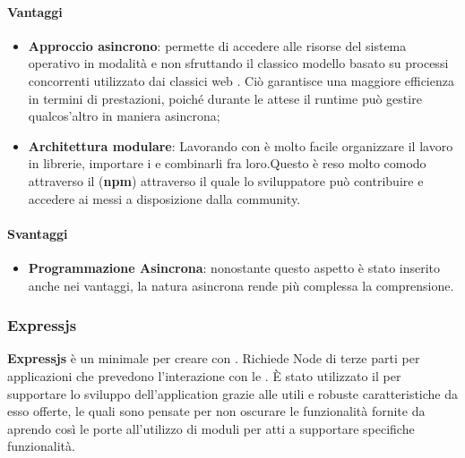 \paragraph{Vantaggi}
\begin{itemize}
\item \textbf{Approccio asincrono}:  permette di accedere alle risorse del sistema operativo in modalità  e non sfruttando il classico modello basato su processi concorrenti utilizzato dai classici web . Ciò garantisce una maggiore efficienza in termini di prestazioni, poiché durante le attese il runtime può gestire qualcos’altro in maniera asincrona;
\item \textbf{Architettura modulare}: Lavorando con  è molto facile organizzare il lavoro in librerie, importare i  e combinarli fra loro.Questo è reso molto comodo attraverso il  (\textbf{npm}) attraverso il quale lo sviluppatore può contribuire e accedere ai  messi a disposizione dalla community.
\end{itemize}

\paragraph{Svantaggi}
\begin{itemize}
\item \textbf{Programmazione Asincrona}: nonostante questo aspetto è stato inserito anche nei vantaggi, la natura asincrona rende più complessa la comprensione.
\end{itemize}

	\subsubsection{Expressjs}
\textbf{Expressjs} è un  minimale per creare   con . Richiede  Node di terze parti per applicazioni che prevedono l'interazione con le .
È stato utilizzato il   per supportare lo sviluppo dell'application  grazie alle utili e robuste caratteristiche da esso offerte, le quali sono pensate per non oscurare le funzionalità fornite da  aprendo così le porte all'utilizzo di moduli per  atti a supportare specifiche funzionalità.

